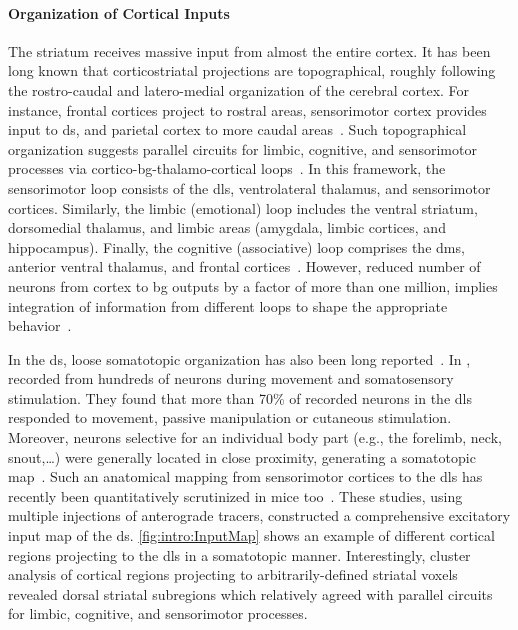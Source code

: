\paragraph{Organization of Cortical Inputs}
The striatum receives massive input from almost the entire cortex.
It has been long known that corticostriatal projections are topographical, roughly following the rostro-caudal and latero-medial organization of the cerebral cortex.
For instance, frontal cortices project to rostral areas, sensorimotor cortex provides input to \gls{ds}, and parietal cortex to more caudal areas~\cite{Dudman2015Book}.
Such topographical organization suggests parallel circuits for limbic, cognitive, and sensorimotor processes via cortico-\gls{bg}-thalamo-cortical loops~\cite{Alexander1986}.
In this framework, the sensorimotor loop consists of the \gls{dls}, ventrolateral thalamus, and sensorimotor cortices.
Similarly, the limbic (emotional) loop includes the ventral striatum, dorsomedial thalamus, and limbic areas (amygdala, limbic cortices, and hippocampus).
Finally, the cognitive (associative) loop comprises the \gls{dms}, anterior ventral thalamus, and frontal cortices~\cite{Jahanshahi2015NatRevNeurosci}.
However, reduced number of neurons from cortex to \gls{bg} outputs by a factor of more than one million, implies integration of information from different loops to shape the appropriate behavior~\cite{Boraud2018ProgNeurobiol}.
\par
In the \gls{ds}, loose somatotopic organization has also been long reported~\cite[see][as an early review]{Mink1996}.
In \citeyear{Carelli1991}, \citeauthor{Carelli1991} recorded from hundreds of neurons during movement and somatosensory stimulation.
They found that more than 70\% of recorded neurons in the \gls{dls} responded to movement, passive manipulation or cutaneous stimulation.
Moreover, neurons selective for an individual body part (e.g., the forelimb, neck, snout,\dots) were generally located in close proximity, generating a somatotopic map~\cite{Carelli1991}.
Such an anatomical mapping from sensorimotor cortices to the \gls{dls} has recently been quantitatively scrutinized in mice too~\cite{Hunnicutt2016, Hintiryan2016NN}.
These studies, using multiple injections of anterograde tracers, constructed a comprehensive excitatory input map of the \gls{ds}.
\autoref{fig:intro:InputMap} shows an example of different cortical regions projecting to the \gls{dls} in a somatotopic manner.
Interestingly, cluster analysis of cortical regions projecting to arbitrarily-defined striatal voxels revealed dorsal striatal subregions which relatively agreed with parallel circuits for limbic, cognitive, and sensorimotor processes.
